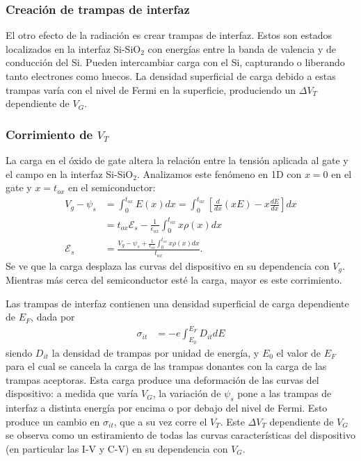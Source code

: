 \subsubsection{Creación de trampas de interfaz}
El otro efecto de la radiación es crear trampas de interfaz.
Estos son estados localizados en la interfaz Si-SiO$_2$ con
energías entre la banda de valencia y de conducción del Si.
Pueden intercambiar carga con el Si,
capturando o liberando tanto electrones como huecos.
La densidad superficial de carga debido a estas trampas varía con el nivel de
Fermi en la superficie, produciendo un $\Delta V_T$ dependiente de $V_G$.
\subsubsection{Corrimiento de $V_T$}
\label{corrimientovt}
La carga en el óxido de gate altera la relación 
entre la tensión aplicada al gate y el campo en la interfaz Si-SiO$_2$.
Analizamos este fenómeno en 1D con $x=0$ en el gate y $x=t_{ox}$
en el semiconductor:
\begin{align*}
    V_g-\psi_s&=\int_0^{t_{ox}}E(x)dx=
    \int_0^{t_{ox}}\left[\frac d{dx}(xE)-x\frac{dE}{dx}\right]dx\\
    &=t_{ox}\mathscr{E}_s-\frac 1{\epsilon_{ox}}\int_0^{t_{ox}}x\rho(x)dx\\
    \mathscr{E}_s &= \frac{V_g-\psi_s+
        \frac 1{\epsilon_{ox}}\int_0^{t_{ox}}x\rho(x)dx}{t_{ox}}.
\end{align*}
Se ve que la carga desplaza las curvas del dispositivo 
en su dependencia con $V_g$.
Mientras más cerca del semiconductor esté la carga,
mayor es este corrimiento.

Las trampas de interfaz contienen una densidad superficial de carga dependiente
de $E_F$, dada por
\begin{align*}
    \sigma_{it} &= -e\int_{E_0}^{E_F} D_{it}dE
\end{align*}
siendo $D_{it}$ la densidad de trampas por unidad de energía,
y $E_0$ el valor de $E_F$ para el cual se cancela la carga de las trampas
donantes con la carga de las trampas aceptoras.
Esta carga produce una deformación de las curvas del dispositivo:
a medida que varía $V_G$,
la variación de $\psi_s$ pone a las trampas de interfaz a distinta energía
por encima o por debajo del nivel de Fermi.
Esto produce un cambio en $\sigma_{it}$,
que a su vez corre el $V_T$.
Este $\Delta V_T$ dependiente de $V_G$ 
se observa como un estiramiento de todas las curvas características del
dispositivo (en particular las I-V y C-V) en su dependencia con $V_G$.
